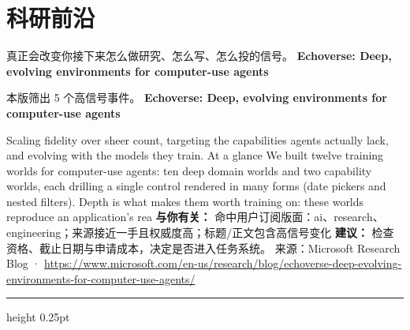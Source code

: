 \documentclass[10.5pt]{ctexart}
\begin{document}
\section*{科研前沿}
{\color{ormuted} 真正会改变你接下来怎么做研究、怎么写、怎么投的信号。}
\vspace{2mm}
{\LARGE\bfseries Echoverse: Deep, evolving environments for computer-use agents}\par
\vspace{1mm}
{\color{ormuted} 本版筛出 5 个高信号事件。}
\vspace{3mm}
{\Large\bfseries Echoverse: Deep, evolving environments for computer-use agents}\par
Scaling fidelity over sheer count, targeting the capabilities agents actually lack, and evolving with the models they train. At a glance We built twelve training worlds for computer-use agents: ten deep domain worlds and two capability worlds, each drilling a single control rendered in many forms (date pickers and nested filters). Depth is what makes them worth training on: these worlds reproduce an application’s rea
\textbf{与你有关：} 命中用户订阅版面：ai、research、engineering；来源接近一手且权威度高；标题/正文包含高信号变化
\textbf{建议：} 检查资格、截止日期与申请成本，决定是否进入任务系统。
{\footnotesize\color{ormuted} 来源：Microsoft Research Blog · \url{https://www.microsoft.com/en-us/research/blog/echoverse-deep-evolving-environments-for-computer-use-agents/}}
\vspace{4mm}
\hrule height 0.25pt
\vspace{3mm}
\end{document}
